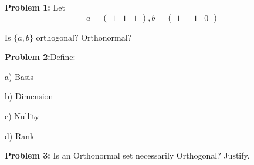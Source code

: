 \documentclass[a4paper,12pt]{article}
\begin{document}
{\Large{\bf Problem 1:}} Let \[ a= \left( \begin{array}{ccc}1 & 1 & 1\end{array} \right), b= \left( \begin{array}{ccc}1 & -1 & 0\end{array} \right)\]

Is $\{a,b\}$ orthogonal? Orthonormal? 

{\Large{\bf Problem 2:}}Define:

a) Basis

b) Dimension

c) Nullity

d) Rank

{\Large{\bf Problem 3:}} Is an Orthonormal set necessarily Orthogonal? Justify.
\end{document}
